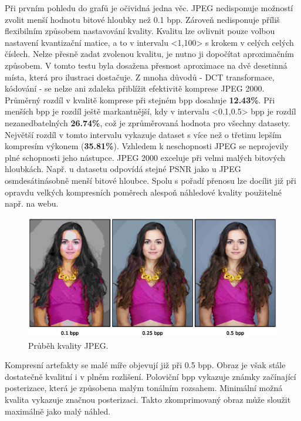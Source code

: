 \noindent Při prvním pohledu do grafů je očividná jedna věc. JPEG nedisponuje možností zvolit menší hodnotu bitové hloubky než 0.1 bpp. Zároveň nedisponuje příliš flexibilním způsobem nastavování kvality. Kvalitu lze ovlivnit pouze volbou nastavení kvantizační matice, a to v intervalu <1,100> s krokem v celých celých číslech. Nelze přesně zadat zvolenou kvalitu, je nutno ji dopočítat aproximačním způsobem. V tomto testu byla dosažena přesnost aproximace na dvě desetinná místa, která pro ilustraci dostačuje.
Z mnoha důvodů - DCT transformace, kódování - se nelze ani zdaleka přiblížit efektivitě komprese JPEG 2000. Průměrný rozdíl v kvalitě komprese při stejném bpp dosahuje \textbf{12.43\%}. Při menších bpp je rozdíl ještě markantnější, kdy v intervalu <0.1,0.5> bpp je rozdíl nezanedbatelných \textbf{26.74\%}, což je zprůměrovaná hodnota pro všechny datasety. Největší rozdíl v tomto intervalu vykazuje dataset  s více než o třetinu lepším kompresím výkonem (\textbf{35.81\%}). Vzhledem k neschopnosti JPEG se neprojevily plné schopnosti jeho nástupce. JPEG 2000 exceluje při velmi malých bitových hloubkách. Např. u datasetu  odpovídá stejné PSNR jako u JPEG osmdesátinásobně menší bitové hloubce. Spolu s pořadí přenosu lze docílit již při opravdu velkých kompresních poměrech alespoň náhledové kvality použitelné např. na webu.

\begin{figure}[hbt!]
  \centering
  \hspace*{-0.75cm}
  \includegraphics[width=16cm]{obrazky-figures/odhad/fotky_kvalita_jpeg_odhad.eps}
  \caption{Průběh kvality JPEG.}
\end{figure}

\noindent Kompresní artefakty se malé míře objevují již při 0.5 bpp. Obraz je však stále dostatečně kvalitní i v plném rozlišení. Poloviční bpp vykazuje známky začínající posterizace, která je způsobena malým tonálním rozsahem. Minimální možná kvalita vykazuje značnou posterizaci. Takto zkomprimovaný obraz může sloužit maximálně jako malý náhled.

